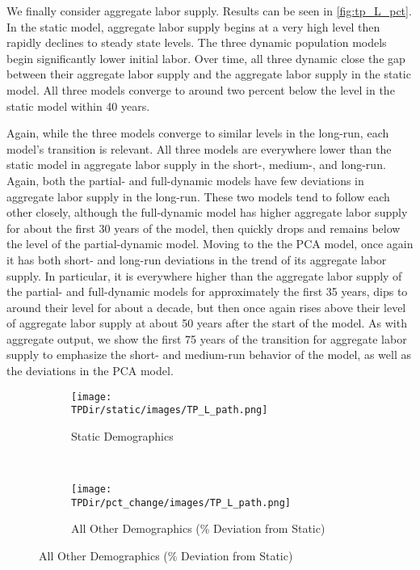 \documentclass[10pt]{article}
\numberwithin{equation}{subsection}
\newcommand*{\TPDir}{../../code/Rick/OUTPUT/TP}
\begin{document}
\par We finally consider aggregate labor supply. Results can be seen in \autoref{fig:tp_L_pct}. In the static model, aggregate labor supply begins at a very high level then rapidly declines to steady state levels. The three dynamic population models begin significantly lower initial labor. Over time, all three dynamic close the gap between their aggregate labor supply and the aggregate labor supply in the static model. All three models converge to around two percent below the level in the static model within 40 years.

\par Again, while the three models converge to similar levels in the long-run, each model's transition is relevant. All three models are everywhere lower than the static model in aggregate labor supply in the short-, medium-, and long-run. Again, both the partial- and full-dynamic models have few deviations in aggregate labor supply in the long-run. These two models tend to follow each other closely, although the full-dynamic model has higher aggregate labor supply for about the first 30 years of the model, then quickly drops and remains below the level of the partial-dynamic model. Moving to the the PCA model, once again it has both short- and long-run deviations in the trend of its aggregate labor supply. In particular, it is everywhere higher than the aggregate labor supply of the partial- and full-dynamic models for approximately the first 35 years, dips to around their level for about a decade, but then once again rises above their level of aggregate labor supply at about 50 years after the start of the model. As with aggregate output, we show the first 75 years of the transition for aggregate labor supply to emphasize the short- and medium-run behavior of the model, as well as the deviations in the PCA model.

\begin{figure}[H]
   \caption{\label{fig:tp_L_pct}Time Path of Aggregate Labor Supply \(\hat{L}_t\)}
   \begin{subfigure}{0.5\textwidth}
      \centering
      \texttt{[image: \\TPDir/static/images/TP\_L\_path.png]}
      \caption{Static Demographics}
   \end{subfigure}%
   ~
   \begin{subfigure}{0.5\textwidth}
      \centering
      \texttt{[image: \\TPDir/pct\_change/images/TP\_L\_path.png]}
      \caption{All Other Demographics (\% Deviation from Static)}
   \end{subfigure}
\end{figure}
\end{document}
